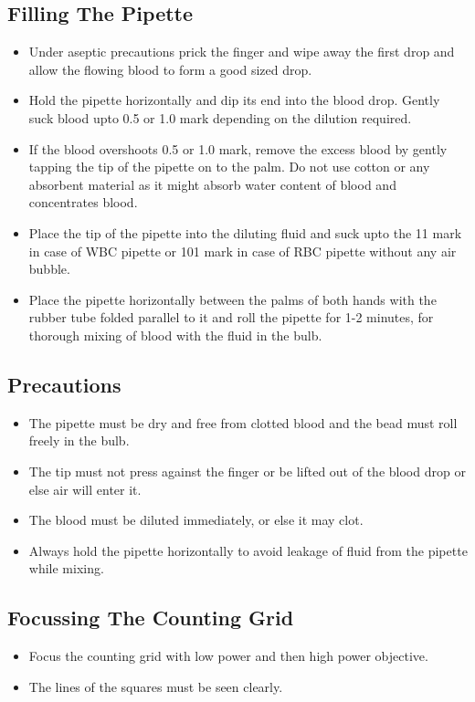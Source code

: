 \documentclass[a4paper,12pt]{book}
\begin{document}
\subsection*{Filling The Pipette}
\begin{itemize}

\item{Under aseptic precautions prick the finger and wipe away the first drop and allow the flowing blood to form a good sized drop.}
\item{Hold the pipette horizontally and dip its end into the blood drop. Gently suck blood upto 0.5 or 1.0 mark depending on the dilution required.}

\item{If the blood overshoots 0.5 or 1.0 mark, remove the excess blood by gently tapping the tip of the pipette on to the palm. Do not use cotton or any absorbent material as it might absorb water content of blood and concentrates blood.}
\item{Place the tip of the pipette into the diluting fluid and suck upto the 11 mark in case of WBC pipette or 101 mark in case of RBC pipette without any air bubble.}
\item{Place the pipette horizontally between the palms of both hands with the rubber tube folded parallel to it and roll the pipette for 1-2 minutes, for thorough mixing of blood with the fluid in the bulb.}

\end{itemize}

\subsection*{Precautions}
\begin{itemize}

\item{The pipette must be dry and free from clotted blood and the bead must roll freely in the bulb.}
\item{The tip must not press against the finger or be lifted out of the blood drop or else air will enter it.}
\item{The blood must be diluted immediately, or else it may clot.}
\item{Always hold the pipette horizontally to avoid leakage of fluid from the pipette while mixing.}

\end{itemize}


\subsection*{Focussing The Counting Grid}
\begin{itemize}

	\item{	Focus the counting grid with low power and then high power objective.}
	\item{	The lines of the squares must be seen clearly.}
\end{itemize}
\end{document}
